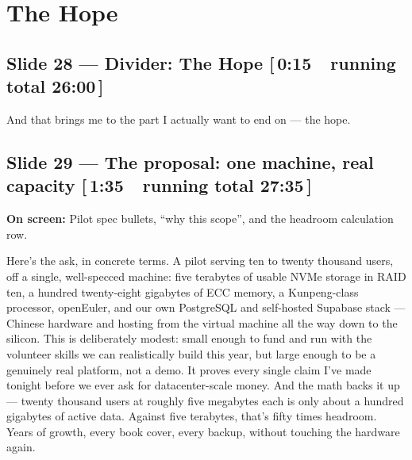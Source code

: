 \documentclass[11pt]{article}
\newcommand{\onscreen}[1]{\noindent\textbf{\color{sovGrey}On screen:} #1\par\vspace{4pt}}
\newcommand{\timing}[2]{\hfill{\normalsize\color{sovGrey}[\,#1\ \textbar\ running total #2\,]}}
\begin{document}
\section{The Hope}

\subsection*{Slide 28 --- Divider: The Hope \timing{0:15}{26:00}}
\begin{sayit}
And that brings me to the part I actually want to end on --- the hope.
\end{sayit}

\subsection*{Slide 29 --- The proposal: one machine, real capacity \timing{1:35}{27:35}}
\onscreen{Pilot spec bullets, ``why this scope'', and the headroom calculation row.}
\begin{sayit}
Here's the ask, in concrete terms. A pilot serving ten to twenty thousand users, off a
single, well-specced machine: five terabytes of usable NVMe storage in RAID ten, a
hundred twenty-eight gigabytes of ECC memory, a Kunpeng-class processor, openEuler, and
our own PostgreSQL and self-hosted Supabase stack --- Chinese hardware and hosting from
the virtual machine all the way down to the silicon. This is deliberately modest: small
enough to fund and run with the volunteer skills we can realistically build this year,
but large enough to be a genuinely real platform, not a demo. It proves every single
claim I've made tonight before we ever ask for datacenter-scale money. And the math
backs it up --- twenty thousand users at roughly five megabytes each is only about a
hundred gigabytes of active data. Against five terabytes, that's fifty times headroom.
Years of growth, every book cover, every backup, without touching the hardware again.
\end{sayit}
\end{document}
